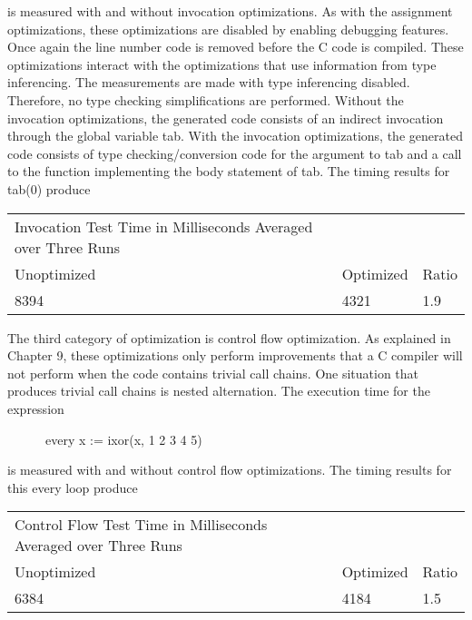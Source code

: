 \noindent is measured with and without invocation optimizations. As
with the assignment optimizations, these optimizations are disabled by
enabling debugging features. Once again the line number code is
removed before the C code is compiled.  These optimizations interact
with the optimizations that use information from type inferencing. The
measurements are made with type inferencing disabled. Therefore, no
type checking simplifications are performed. Without the invocation
optimizations, the generated code consists of an indirect invocation
through the global variable tab. With the invocation optimizations,
the generated code consists of type checking/conversion code for the
argument to tab and a call to the function implementing the body
statement of tab. The timing results for tab(0) produce

\begin{center}
\tablefirsthead{}
\tablehead{}
\tabletail{}
\tablelasttail{}
\begin{xtabular}{m{3.24556in}m{0.6775598in}m{0.34275985in}}
 Invocation Test\newline
Time in Milliseconds Averaged over Three Runs &
~
 &
~
\\
 Unoptimized &
 Optimized &
 Ratio\\
 8394  &
 4321  &
 1.9 \\
\end{xtabular}
\end{center}

The third category of optimization is control flow optimization. As
explained in Chapter 9, these optimizations only perform improvements
that a C compiler will not perform when the code contains trivial call
chains. One situation that produces trivial call chains is nested
alternation. The execution time for the expression

{\ttfamily\mdseries
\ \ \ \ \ \ every x := ixor(x, 1 {\textbar} 2 {\textbar} 3 {\textbar} 4 {\textbar} 5)}

\noindent is measured with and without control flow optimizations. The
timing results for this every loop produce

\begin{center}
\tablefirsthead{}
\tablehead{}
\tabletail{}
\tablelasttail{}
\begin{xtabular}{m{3.2837598in}m{0.6726598in}m{0.36295986in}}
 Control Flow Test\newline
Time in Milliseconds Averaged over Three Runs &
~
 &
~
\\
 Unoptimized &
 Optimized &
 Ratio\\
 6384  &
 4184  &
 1.5 \\
\end{xtabular}
\end{center}

